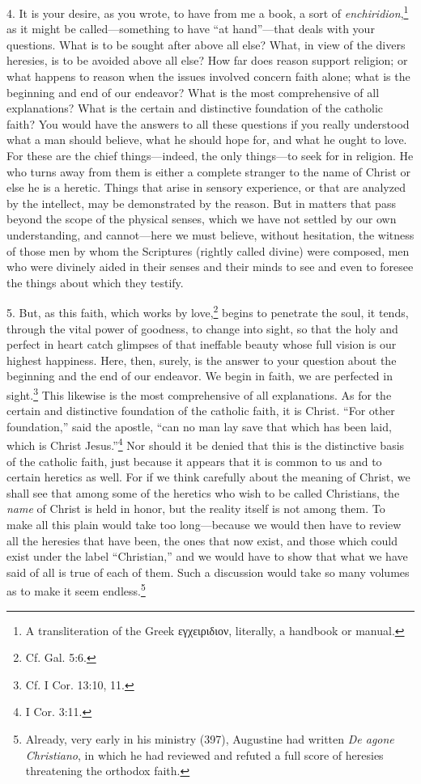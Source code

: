4. It is your desire, as you wrote, to have from me a book, a sort of \emph{enchiridion},\footnote{A transliteration of the Greek \textgreek{εγχειριδιον}, literally, a handbook or manual.} as it might be called—something to have ``at hand''—that deals with your questions. What is to be sought after above all else? What, in view of the divers heresies, is to be avoided above all else? How far does reason support religion; or what happens to reason when the issues involved concern faith alone; what is the beginning and end of our endeavor? What is the most comprehensive of all explanations? What is the certain and distinctive foundation of the catholic faith? You would have the answers to all these questions if you really understood what a man should believe, what he should hope for, and what he ought to love. For these are the chief things—indeed, the only things—to seek for in religion. He who turns away from them is either a complete stranger to the name of Christ or else he is a heretic. Things that arise in sensory experience, or that are analyzed by the intellect, may be demonstrated by the reason. But in matters that pass beyond the scope of the physical senses, which we have not settled by our own understanding, and cannot—here we must believe, without hesitation, the witness of those men by whom the Scriptures (rightly called divine) were composed, men who were divinely aided in their senses and their minds to see and even to foresee the things about which they testify.

5. But, as this faith, which works by love,\footnote{Cf. Gal. 5:6.} begins to penetrate the soul, it tends, through the vital power of goodness, to change into sight, so that the holy and perfect in heart catch glimpses of that ineffable beauty whose full vision is our highest happiness. Here, then, surely, is the answer to your question about the beginning and the end of our endeavor. We begin in faith, we are perfected in sight.\footnote{Cf. I Cor. 13:10, 11.} This likewise is the most comprehensive of all explanations. As for the certain and distinctive foundation of the catholic faith, it is Christ. ``For other foundation,'' said the apostle, ``can no man lay save that which has been laid, which is Christ Jesus.''\footnote{I Cor. 3:11.} Nor should it be denied that this is the distinctive basis of the catholic faith, just because it appears that it is common to us and to certain heretics as well. For if we think carefully about the meaning of Christ, we shall see that among some of the heretics who wish to be called Christians, the \emph{name} of Christ is held in honor, but the reality itself is not among them. To make all this plain would take too long—because we would then have to review all the heresies that have been, the ones that now exist, and those which could exist under the label ``Christian,'' and we would have to show that what we have said of all is true of each of them. Such a discussion would take so many volumes as to make it seem endless.\footnote{Already, very early in his ministry (397), Augustine had written \emph{De agone Christiano}, in which he had reviewed and refuted a full score of heresies threatening the orthodox faith.}

